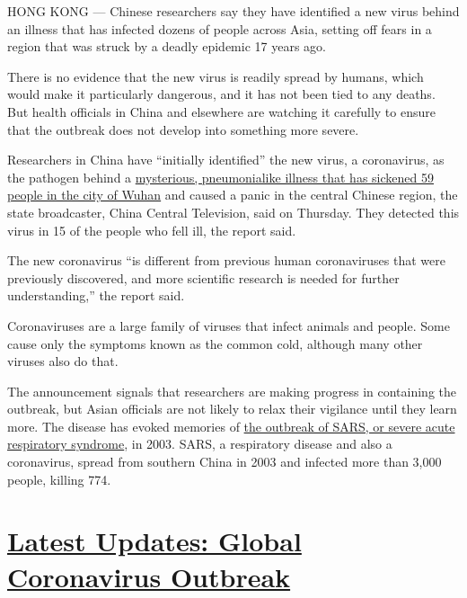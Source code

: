 HONG KONG --- Chinese researchers say they have identified a new virus
behind an illness that has infected dozens of people across Asia,
setting off fears in a region that was struck by a deadly epidemic 17
years ago.

There is no evidence that the new virus is readily spread by humans,
which would make it particularly dangerous, and it has not been tied to
any deaths. But health officials in China and elsewhere are watching it
carefully to ensure that the outbreak does not develop into something
more severe.

Researchers in China have ``initially identified'' the new virus, a
coronavirus, as the pathogen behind a
\href{https://www.nytimes3xbfgragh.onion/2020/01/06/world/asia/china-SARS-pneumonialike.html}{mysterious,
pneumonialike illness that has sickened 59 people in the city of Wuhan}
and caused a panic in the central Chinese region, the state broadcaster,
China Central Television, said on Thursday. They detected this virus in
15 of the people who fell ill, the report said.

The new coronavirus ``is different from previous human coronaviruses
that were previously discovered, and more scientific research is needed
for further understanding,'' the report said.

Coronaviruses are a large family of viruses that infect animals and
people. Some cause only the symptoms known as the common cold, although
many other viruses also do that.

The announcement signals that researchers are making progress in
containing the outbreak, but Asian officials are not likely to relax
their vigilance until they learn more. The disease has evoked memories
of
\href{https://www.nytimes3xbfgragh.onion/2003/04/27/world/the-sars-epidemic-the-path-from-china-s-provinces-a-crafty-germ-breaks-out.html}{the
outbreak of SARS, or severe acute respiratory syndrome}, in 2003. SARS,
a respiratory disease and also a coronavirus, spread from southern China
in 2003 and infected more than 3,000 people, killing 774.

\hypertarget{latest-updates-global-coronavirus-outbreak}{%
\section{\texorpdfstring{\href{https://www.nytimes3xbfgragh.onion/2020/08/01/world/coronavirus-covid-19.html?action=click\&pgtype=Article\&state=default\&region=MAIN_CONTENT_1\&context=storylines_live_updates}{Latest
Updates: Global Coronavirus
Outbreak}}{Latest Updates: Global Coronavirus Outbreak}}\label{latest-updates-global-coronavirus-outbreak}}

